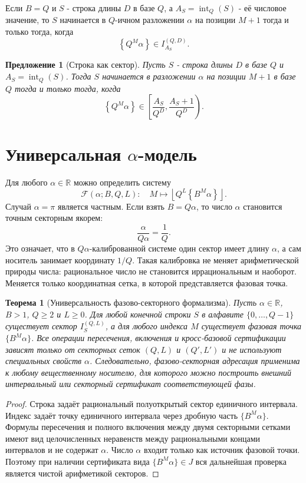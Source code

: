 \documentclass[11pt,a4paper]{article}
\newtheorem{proposition}{Предложение}
\newtheorem{theorem}{Теорема}
\newcommand{\fracpart}[1]{\left\{#1\right\}}
\newcommand{\floor}[1]{\left\lfloor #1 \right\rfloor}
\newcommand{\R}{\mathbb{R}}
\begin{document}
Если $B=Q$ и $S$ - строка длины $D$ в базе $Q$, а $A_S=\operatorname{int}_Q(S)$ - её числовое значение, то $S$ начинается в $Q$-ичном разложении $\alpha$ на позиции $M+1$ тогда и только тогда, когда
\[
  \fracpart{Q^M\alpha}\in I_{A_S}^{(Q,D)}.
\]

\begin{proposition}[Строка как сектор]
Пусть $S$ - строка длины $D$ в базе $Q$ и $A_S=\operatorname{int}_Q(S)$.  Тогда $S$ начинается в разложении $\alpha$ на позиции $M+1$ в базе $Q$ тогда и только тогда, когда
\[
  \fracpart{Q^M\alpha}\in \left[\frac{A_S}{Q^D},\frac{A_S+1}{Q^D}\right).
\]
\end{proposition}

\section{Универсальная $\alpha$-модель}

Для любого $\alpha\in\R$ можно определить систему
\[
  \mathcal{F}(\alpha;B,Q,L):\quad M\mapsto \floor{Q^L\fracpart{B^M\alpha}}.
\]
Случай $\alpha=\pi$ является частным.  Если взять $B=Q\alpha$, то число $\alpha$ становится точным секторным якорем:
\[
  \frac{\alpha}{Q\alpha}=\frac1Q.
\]
Это означает, что в $Q\alpha$-калиброванной системе один сектор имеет длину $\alpha$, а сам носитель занимает координату $1/Q$.  Такая калибровка не меняет арифметической природы числа: рациональное число не становится иррациональным и наоборот.  Меняется только координатная сетка, в которой представляется фазовая точка.


\begin{theorem}[Универсальность фазово-секторного формализма]
Пусть $\alpha\in\R$, $B>1$, $Q\ge2$ и $L\ge0$.  Для любой конечной строки $S$ в алфавите $\{0,\dots,Q-1\}$ существует сектор $I_S^{(Q,L)}$, а для любого индекса $M$ существует фазовая точка $\{B^M\alpha\}$.  Все операции пересечения, включения и кросс-базовой сертификации зависят только от секторных сеток $(Q,L)$ и $(Q',L')$ и не используют специальных свойств $\alpha$.  Следовательно, фазово-секторная адресация применима к любому вещественному носителю, для которого можно построить внешний интервальный или секторный сертификат соответствующей фазы.
\end{theorem}

\begin{proof}
Строка задаёт рациональный полуоткрытый сектор единичного интервала.  Индекс задаёт точку единичного интервала через дробную часть $\{B^M\alpha\}$.  Формулы пересечения и полного включения между двумя секторными сетками имеют вид целочисленных неравенств между рациональными концами интервалов и не содержат $\alpha$.  Число $\alpha$ входит только как источник фазовой точки.  Поэтому при наличии сертификата вида $\{B^M\alpha\}\in J$ вся дальнейшая проверка является чистой арифметикой секторов.
\end{proof}
\end{document}

